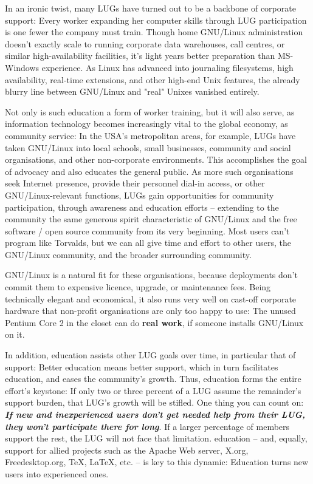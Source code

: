 In an ironic twist, many LUGs have turned out to be a backbone of
corporate support: Every worker expanding her computer skills through
LUG participation is one fewer the company must train.  Though home
GNU/Linux administration doesn't exactly scale to running corporate data
warehouses, call centres, or similar high-availability facilities, it's
light years better preparation than MS-Windows experience.  As Linux has
advanced into journaling filesystems, high availability, real-time
extensions, and other high-end Unix features, the already blurry line
between GNU/Linux and "real" Unixes vanished entirely.

Not only is such education a form of worker training, but it will also
serve, as information technology becomes increasingly vital to the
global economy, as community service: In the USA's metropolitan areas,
for example, LUGs have taken GNU/Linux into local schools, small businesses,
community and social organisations, and other non-corporate
environments. This accomplishes the goal of advocacy and also
educates the general public.  As more such organisations seek Internet
presence, provide their personnel dial-in access, or other
GNU/Linux-relevant functions, LUGs gain opportunities for community
participation, through awareness and education efforts -- extending to
the community the same generous spirit characteristic of GNU/Linux and the
free software / open source community from its very beginning. Most
users can't program like Torvalds, but we can all give time and
effort to other users, the GNU/Linux community, and the broader
surrounding community.

GNU/Linux is a natural fit for these organisations, because deployments
don't commit them to expensive licence, upgrade, or maintenance fees.
Being technically elegant and economical, it also runs very well on
cast-off corporate hardware that non-profit organisations are only too
happy to use: The unused Pentium Core 2 in the closet can do {\bfseries real
work}, if someone installs GNU/Linux on it.

In addition, education assists other LUG goals over time, in
particular that of support: Better education means better
support, which in turn facilitates education, and eases the 
community's growth.  Thus, education forms the entire effort's keystone:
If only two or three percent of a LUG assume the remainder's support
burden, that LUG's growth will be stifled. One thing you can count on:
{\bfseries {\itshape If new and inexperienced users don't get needed help
from their LUG, they won't participate there for long\/}}.
If a larger percentage of members support the rest, the LUG will not
face that limitation. education -- and, equally, support for
allied projects such as the Apache Web server, X.org, Freedesktop.org, 
TeX, LaTeX, etc.  -- is key to this dynamic: Education turns new users into
experienced ones.

